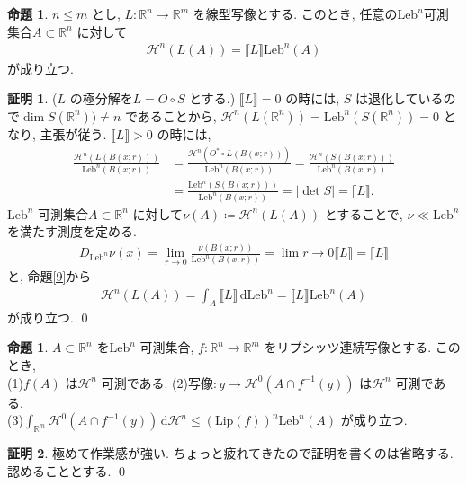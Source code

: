 \documentclass[twocolumn, landscape, a4paper , 8pt, fleqn, titlepage ]{jsarticle}
\theoremstyle{definition}
\newtheorem{prop}[dfn]{命題}
\newtheorem*{pf*}{証明}
\newcommand{\abs}[1]{\left|#1\right|}
\newcommand{\dbra}[1]{\llbracket #1 \rrbracket}
\newcommand{\Leb}{\textrm{Leb}}
\renewcommand{\d}{\, \textrm{d} }
\newcommand{\Lip}[1]{\textrm{Lip}(#1)}
\renewcommand{\-}{\hyphen}
\begin{document}
\begin{prop}\label{7}
$n \leq m$ とし, $L:\mathbb R^n \rightarrow \mathbb R^m$ を線型写像とする. このとき, 任意の$\Leb^n$可測集合$A \subset \mathbb R^n$ に対して
\begin{align*} \mathcal H^n (L(A)) = \dbra L \Leb^n(A)\end{align*}
が成り立つ. 
\end{prop}
\begin{pf*}
($L$ の極分解を$L = O \circ S$ とする.) $\dbra L = 0$ の時には, $S$ は退化しているので$\dim S(\mathbb R^n)) \neq n$ であることから, $\mathcal H ^n (L(\mathbb R^n)) = \Leb^n (S(\mathbb R^n)) = 0 $ となり, 主張が従う. $\dbra L > 0$ の時には, 
\begin{align*}\frac{\mathcal H ^n (L(B(x;r)))}{\Leb ^n (B(x;r))} &= \frac{\mathcal H ^n (O^* \circ L(B(x;r)))}{\Leb ^n (B(x;r))} = \frac{\mathcal H ^n (S(B(x;r)))}{\Leb ^n (B(x;r))} \\&=  \frac{\Leb ^n (S(B(x;r)))}{\Leb ^n (B(x;r))} = \abs{\det S} = \dbra L .\end{align*}
$\Leb^n$ 可測集合$A \subset \mathbb R^n$ に対して$\nu (A) \coloneqq \mathcal H^n (L(A))$ とすることで, $\nu \ll \Leb^n$ を満たす測度を定める. 
\begin{align*} D_{\Leb^n} \nu (x) = \lim_{r\rightarrow 0} \frac{\nu(B(x;r))}{\Leb^n(B(x;r))} = \lim{r\rightarrow 0 } \dbra L = \dbra L\end{align*}
と, 命題\ref{9}から
\begin{align*} \mathcal H ^n (L(A)) = \int_A \dbra L \d \Leb^n = \dbra L \Leb ^n (A) \end{align*}
が成り立つ. 
\qed
\end{pf*}

\begin{prop}
$A\subset \mathbb R^n$ を$\Leb^n$ 可測集合, $f:\mathbb R^n \rightarrow \mathbb R^m$ をリプシッツ連続写像とする. このとき, \\
(1)$f(A)$ は$\mathcal H^n $ 可測である. \quad (2)写像$:y \rightarrow \mathcal H^0(A \cap f^{-1}(y))$ は$\mathcal H^n$ 可測である. \\
(3)$\int_{\mathbb R^m} \mathcal H^0 (A \cap f^{-1} (y)) \d \mathcal H^n \leq (\Lip f )^n \Leb ^n (A)$ が成り立つ. 
\end{prop}
\begin{pf*}
極めて作業感が強い. ちょっと疲れてきたので証明を書くのは省略する. 認めることとする. 
\qed
\end{pf*}
\end{document}
